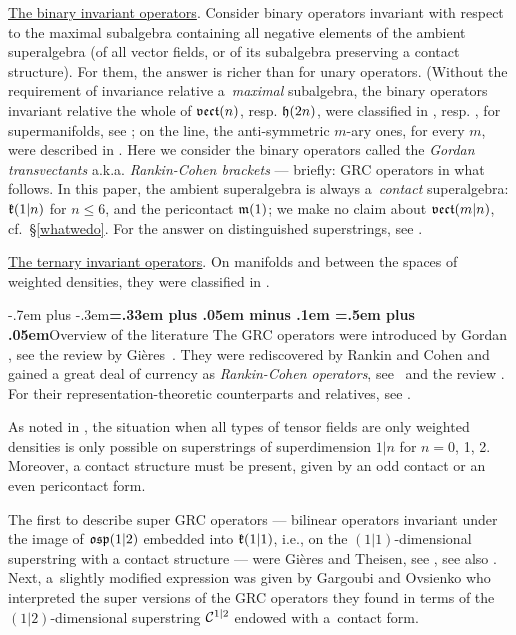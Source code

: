 \documentclass[12pt,a4paper]{amsart}
\makeatletter
\providecommand{\headspaces}{\spaceskip=.33em plus .05em minus .1em \xspaceskip=.5em plus .05em}
\def\subsection{\@startsection{subsection}{2}{0pt}{-1ex \@plus -.4ex \@minus -.2ex}%
  {-.7em plus -.3em}{\normalfont\normalsize\bfseries\boldmath\headspaces}}
\theoremstyle{thm}
\theoremstyle{definition}
\let\ssec\subsection
\makeatother
\begin{document}
\underline{The binary invariant operators}. Consider binary operators invariant with respect to the maximal subalgebra containing all negative elements of the ambient superalgebra (of all vector fields, or of its subalgebra preserving a contact structure). For them, the answer is richer than for unary operators. (Without the requirement of invariance relative a~\textit{maximal} subalgebra, the binary operators invariant relative the whole of ${\mathfrak{vect}}(n)$, resp. ${\mathfrak{h}}(2n)$, were classified in \cite{Gr1}, resp. \cite{Gr2}, for supermanifolds, see \cite{GLS}; on the line, the anti-symmetric $m$-ary ones, for every $m$, were described in \cite{FF}.  Here we consider the binary operators called the \textit{Gordan transvectants} a.k.a. \textit{Rankin-Cohen  brackets} --- briefly: GRC operators in what follows. In this paper, the ambient superalgebra is always a~\textit{contact} superalgebra: ${\mathfrak{k}}(1|n)$ for $n\leq6$, and the pericontact ${\mathfrak{m}}(1)$; we make no claim about ${\mathfrak{vect}}(m|n)$, cf.~\S\ref{whatwedo}. For the answer on distinguished superstrings, see \cite{LShRC}.

\underline{The ternary invariant operators}.  On manifolds and between the spaces of weighted densities, they were classified in \cite{Bter}.

\ssec{Overview of the literature}
The GRC operators were introduced by Gordan \cite{Gor}, see the review by Gi\`eres~\cite{G}. They were rediscovered by Rankin \cite{R} and Cohen \cite{Co} and gained a great deal of currency as \textit{Rankin-Cohen operators}, see~\cite{Z} and the review \cite{El}. For their representation-theoretic counterparts and relatives, see \cite{Y, N, BCK}.

  As noted in \cite{BL}, the situation when all types of tensor fields are only weighted densities is only possible on superstrings of superdimension $1|n$ for $n=0$, 1, 2. Moreover, a contact structure must be present, given by an odd contact or an even pericontact form.

The first to describe super GRC operators --- bilinear operators invariant under the image of ${{\mathfrak{osp}}(1|2)}$ embedded into ${{\mathfrak{k}}(1|1)}$, i.e., on the $(1|1)$-dimensional superstring with a contact structure --- were Gi\`eres and Theisen, see \cite{GT}, see also \cite{H, GMO}. Next, a~slightly modified expression was given by Gargoubi and Ovsienko \cite{GO} who interpreted the super versions of the GRC operators they found in terms of the $(1|2)$-dimensional  superstring ${\mathcal C}^{1|2}$  endowed with a~contact form.
\end{document}
